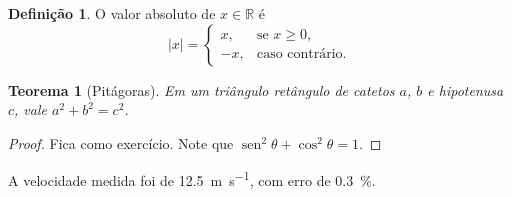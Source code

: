 \documentclass[a4paper]{article}
\newtheorem{teorema}{Teorema}
\theoremstyle{definition}
\newtheorem{definicao}{Definição}
\DeclareMathOperator{\sen}{sen}  %
\begin{document}
\begin{definicao}
O valor absoluto de $x \in \mathbb{R}$ é
\[
  \lvert x \rvert =
  \begin{cases}
    x,  & \text{se } x \geq 0, \\
    -x, & \text{caso contrário.}
  \end{cases}
\]
\end{definicao}

\begin{teorema}[Pitágoras]
Em um triângulo retângulo de catetos $a$, $b$ e hipotenusa $c$, vale
$a^2 + b^2 = c^2$.
\end{teorema}

\begin{proof}
Fica como exercício. Note que $\sen^2\theta + \cos^2\theta = 1$.
\end{proof}

A velocidade medida foi de \qty{12,5}{\metre\per\second}, com erro de
\qty{0,3}{\percent}.
\end{document}
